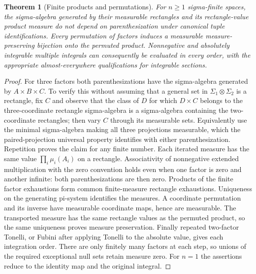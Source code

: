 \documentclass[11pt,oneside,openany]{book}
\newtheorem{theorem}{Theorem}[chapter]
\theoremstyle{definition}
\theoremstyle{remark}
\newcommand{\family}[1]{}
\begin{document}
\begin{theorem}[Finite products and permutations]
\family{D11.08.finite_product_permutations}\label{d11:08:finite-product-permutations}
For $n\geq1$ sigma-finite spaces, the sigma-algebra generated by their
measurable rectangles and its rectangle-value product measure do not
depend on parenthesization under canonical tuple identifications.
Every permutation of factors induces a measurable measure-preserving
bijection onto the permuted product. Nonnegative and absolutely
integrable multiple integrals can consequently be evaluated in every
order, with the appropriate almost-everywhere qualifications for
integrable sections.
\end{theorem}
\begin{proof}
For three factors both parenthesizations have the sigma-algebra generated
by $A\times B\times C$. To verify this without assuming that a general
set in $\Sigma_1\otimes\Sigma_2$ is a rectangle, fix $C$ and observe that
the class of $D$ for which $D\times C$ belongs to the three-coordinate
rectangle sigma-algebra is a sigma-algebra containing the two-coordinate
rectangles; then vary $C$ through its measurable sets. Equivalently use
the minimal sigma-algebra making all three projections measurable, which
the paired-projection universal property identifies with either
parenthesization. Repetition proves the claim for any finite number.
Each iterated measure has the same value $\prod_i\mu_i(A_i)$ on a
rectangle. Associativity of nonnegative extended multiplication with
the zero convention holds even when one factor is zero and another
infinite: both parenthesizations are then zero. Products of the finite
factor exhaustions form common finite-measure rectangle exhaustions.
Uniqueness on the generating pi-system identifies the measures.
A coordinate permutation and its inverse have measurable coordinate
maps, hence are measurable. The transported measure has the same
rectangle values as the permuted product, so the same uniqueness proves
measure preservation. Finally repeated two-factor Tonelli, or Fubini
after applying Tonelli to the absolute value, gives each integration
order. There are only finitely many factors at each step, so unions of
the required exceptional null sets retain measure zero. For $n=1$
the assertions reduce to the identity map and the original integral.
\end{proof}
\end{document}
